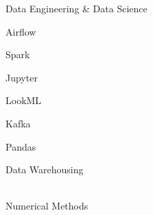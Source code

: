 \begin{skillset}{Data Engineering \& Data Science}
  \item Airflow
  \item Spark
  \item Jupyter
  \item LookML
  \item Kafka
  \item Pandas
  \item Data Warehousing
  \item \\Numerical Methods
\end{skillset}
